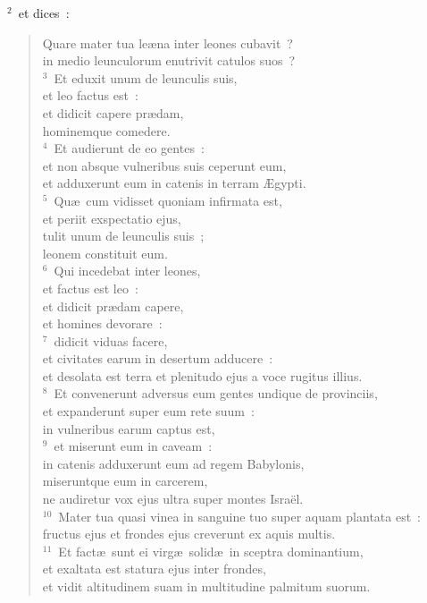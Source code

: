 ${}^{2}$~et dices~: \begin{flushleft}\begin{verse}Quare mater tua le\ae na inter leones cubavit~?\\ in medio leunculorum enutrivit catulos suos~?\\
${}^{3}$~Et eduxit unum de leunculis suis,\\ et leo factus est~:\\ et didicit capere pr\ae dam,\\ hominemque comedere.\\
${}^{4}$~Et audierunt de eo gentes~:\\ et non absque vulneribus suis ceperunt eum,\\ et adduxerunt eum in catenis in terram \AE gypti.\\
${}^{5}$~Qu\ae\ cum vidisset quoniam infirmata est,\\ et periit exspectatio ejus,\\ tulit unum de leunculis suis~;\\ leonem constituit eum.\\
${}^{6}$~Qui incedebat inter leones,\\ et factus est leo~:\\ et didicit pr\ae dam capere,\\ et homines devorare~:\\
${}^{7}$~didicit viduas facere,\\ et civitates earum in desertum adducere~:\\ et desolata est terra et plenitudo ejus a voce rugitus illius.\\
${}^{8}$~Et convenerunt adversus eum gentes undique de provinciis,\\ et expanderunt super eum rete suum~:\\ in vulneribus earum captus est,\\
${}^{9}$~et miserunt eum in caveam~:\\ in catenis adduxerunt eum ad regem Babylonis,\\ miseruntque eum in carcerem,\\ ne audiretur vox ejus ultra super montes Isra\"el.\\
${}^{10}$~Mater tua quasi vinea in sanguine tuo super aquam plantata est~:\\ fructus ejus et frondes ejus creverunt ex aquis multis.\\
${}^{11}$~Et fact\ae\ sunt ei virg\ae\ solid\ae\ in sceptra dominantium,\\ et exaltata est statura ejus inter frondes,\\ et vidit altitudinem suam in multitudine palmitum suorum.\\

\end{verse}
\end{flushleft}
